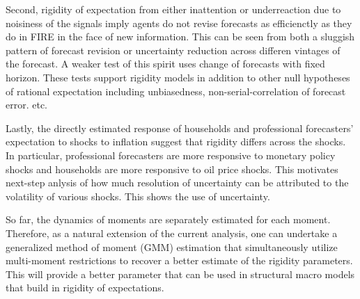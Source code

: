 \documentclass[]{article}
\begin{document}
Second, rigidity of expectation from either inattention or underreaction due to noisiness of the signals imply agents do not revise forecasts as efficienctly as they do in FIRE in the face of new information. This can be seen from both a sluggish pattern of forecast revision or uncertainty reduction across differen vintages of the forecast. A weaker test of this spirit uses change of forecasts with fixed horizon. These tests support rigidity models in addition to other null hypotheses of rational expectation including unbiasedness,  non-serial-correlation of forecast error. etc.

Lastly, the directly estimated response of households and professional forecasters' expectation to shocks to inflation suggest that rigidity differs across the shocks. In particular, professional forecasters are more responsive to monetary policy shocks and households are more responsive to oil price shocks. This motivates next-step anlysis of how much resolution of uncertainty can be attributed to the volatility of various shocks. This shows the use of uncertainty.

So far, the dynamics of moments are separately estimated for each moment. Therefore, as a natural extension of the current analysis, one can  undertake a generalized method of moment (GMM) estimation that simultaneously utilize multi-moment restrictions to recover a better estimate of the rigidity parameters.  This will provide a better parameter that can be used in structural macro models that build in rigidity of expectations. 



\end{document}
